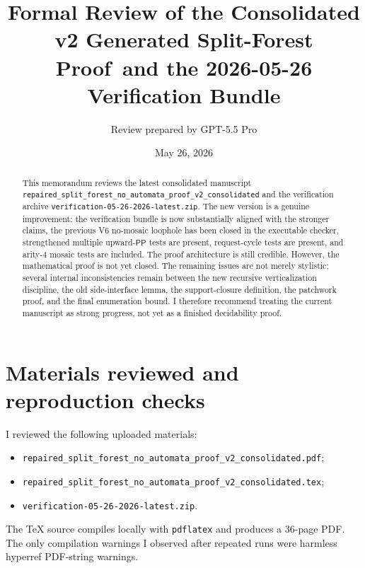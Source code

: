 \documentclass[11pt]{article}
\title{Formal Review of the Consolidated v2 Generated Split-Forest Proof\
       and the 2026-05-26 Verification Bundle}
\author{Review prepared by GPT-5.5 Pro}
\date{May 26, 2026}
\newcommand{\PP}{\mathsf{PP}}
\begin{document}
\sloppy
\maketitle

\begin{abstract}
This memorandum reviews the latest consolidated manuscript
\texttt{repaired\_split\_forest\_no\_automata\_proof\_v2\_consolidated}
and the verification archive \texttt{verification-05-26-2026-latest.zip}.
The new version is a genuine improvement: the verification bundle is now
substantially aligned with the stronger claims, the previous V6 no-mosaic
loophole has been closed in the executable checker, strengthened multiple
upward-$\PP$ tests are present, request-cycle tests are present, and arity-4
mosaic tests are included.  The proof architecture is still credible.
However, the mathematical proof is not yet closed.  The remaining issues are
not merely stylistic; several internal inconsistencies remain between the new
recursive verticalization discipline, the old side-interface lemma, the
support-closure definition, the patchwork proof, and the final enumeration
bound.  I therefore recommend treating the current manuscript as strong
progress, not yet as a finished decidability proof.
\end{abstract}

\tableofcontents

\section{Materials reviewed and reproduction checks}

I reviewed the following uploaded materials:
\begin{itemize}[leftmargin=2em]
  \item \texttt{repaired\_split\_forest\_no\_automata\_proof\_v2\_consolidated.pdf};
  \item \texttt{repaired\_split\_forest\_no\_automata\_proof\_v2\_consolidated.tex};
  \item \texttt{verification-05-26-2026-latest.zip}.
\end{itemize}
The TeX source compiles locally with \texttt{pdflatex} and produces a
36-page PDF.  The only compilation warnings I observed after repeated runs
were harmless hyperref PDF-string warnings.
\end{document}
